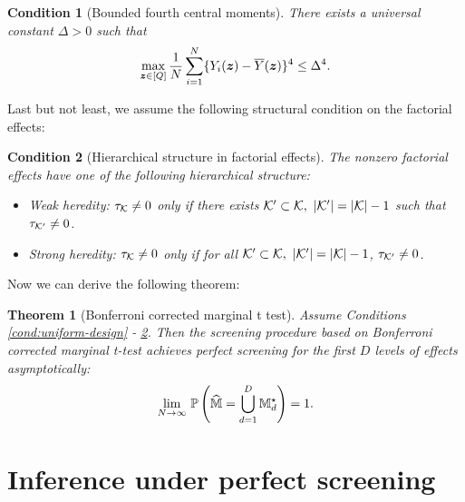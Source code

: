 \documentclass[12pt]{article}
\newtheorem{theorem}{Theorem}
\newtheorem{condition}{Condition}
\begin{document}
\begin{condition}[Bounded fourth central moments]\label{cond:bounded-moments}
There exists a universal constant $ \Delta > 0$ such that
\begin{align}\label{eqn:bounded-moments}
   \max_{{\boldsymbol{z}}\in[Q]}\frac{1}{N}\sum_{i=1}^N \{Y_i({\boldsymbol{z}}) - \overline{Y}({\boldsymbol{z}})\}^4 \le \Delta^4.
\end{align}


\end{condition}


Last but not least, we assume the following structural condition on the factorial effects:
\begin{condition}[Hierarchical structure in factorial effects]\label{cond:heredity} The nonzero factorial effects have one of the following hierarchical structure:
\begin{itemize}
\item Weak heredity: $\tau_{\mathcal{K}}\neq 0$ only if there exists ${\mathcal{K}}'\subset{\mathcal{K}},~|{\mathcal{K}}'| = |{\mathcal{K}}| - 1$ such that $\tau_{{\mathcal{K}}'}\neq 0$.

\item Strong heredity: $\tau_{\mathcal{K}}\neq 0$ only if for all ${\mathcal{K}}'\subset{\mathcal{K}},~|{\mathcal{K}}'| = |{\mathcal{K}}| - 1$, $\tau_{{\mathcal{K}}'}\neq 0$.

\end{itemize}


\end{condition}

Now we can derive the following theorem:
\begin{theorem}[Bonferroni corrected marginal t test]\label{thm:marginal-t}
Assume Conditions \ref{cond:uniform-design} -  \ref{cond:heredity}. Then the  screening procedure based on Bonferroni corrected marginal t-test achieves perfect screening for the first $D$ levels of effects asymptotically: 
\begin{align*}
    \underset{N\to\infty}{\lim}~{\mathbb{P}}\left(\widehat{{\mathbb{M}}} = \bigcup_{d=1}^D{{\mathbb{M}}_d^\star}  \right)
     = 1.
\end{align*}


\end{theorem}



\section{Inference under perfect screening}
\end{document}
